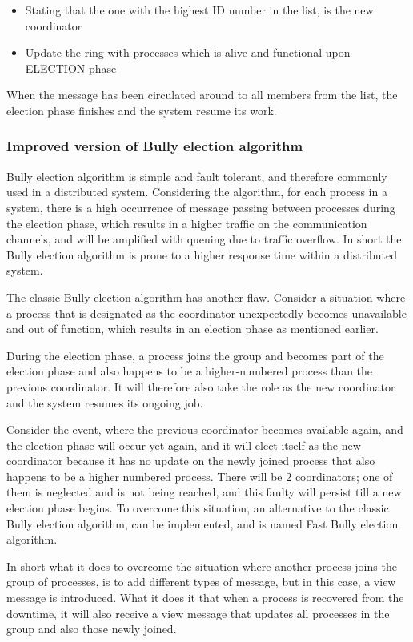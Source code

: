 \begin{itemize}
  \item Stating that the one with the highest ID number in the list, is the new coordinator
  \item Update the ring with processes which is alive and functional upon ELECTION phase
\end{itemize}

When the message has been circulated around to all members from the list, the election phase finishes and the system resume its work.

\subsubsection{Improved version of Bully election algorithm}

Bully election algorithm is simple and fault tolerant, and therefore commonly used in a distributed system. Considering the algorithm, for each process in a system, there is a high occurrence of message passing between processes during the election phase, which results in a higher traffic on the communication channels, and will be amplified with queuing due to traffic overflow. In short the Bully election algorithm is prone to a higher response time within a distributed system.

The classic Bully election algorithm has another flaw. Consider a situation where a process that is designated as the coordinator unexpectedly becomes unavailable and out of function, which results in an election phase as mentioned earlier.

During the election phase, a process joins the group and becomes part of the election phase and also happens to be a higher-numbered process than the previous coordinator. It will therefore also take the role as the new coordinator and the system resumes its ongoing job.

Consider the event, where the previous coordinator becomes available again, and the election phase will occur yet again, and it will elect itself as the new coordinator because it has no update on the newly joined process that also happens to be a higher numbered process. There will be 2 coordinators; one of them is neglected and is not being reached, and this faulty will persist till a new election phase begins.
To overcome this situation, an alternative to the classic Bully election algorithm, can be implemented, and is named Fast Bully election algorithm.

In short what it does to overcome the situation where another process joins the group of processes, is to add different types of message, but in this case, a view message is introduced.
What it does it that when a process is recovered from the downtime, it will also receive a view message that updates all processes in the group and also those newly joined.

